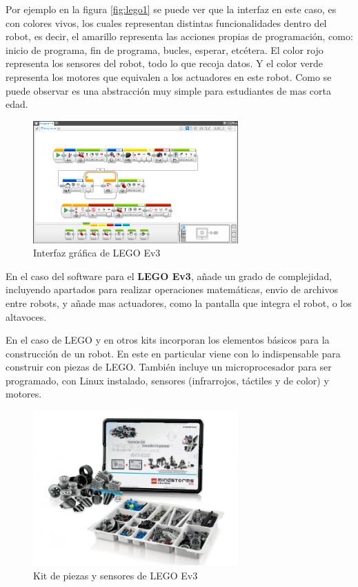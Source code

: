 \begin{itemize}
Por ejemplo en la figura \ref{fig:lego1} se puede ver que la interfaz en este caso, es con colores vivos, los cuales representan distintas funcionalidades dentro del robot, es decir, el amarillo representa las acciones propias de programación, como: inicio de programa, fin de programa, bucles, esperar, etcétera. El color rojo representa los sensores del robot, todo lo que recoja datos. Y el color verde representa los motores que equivalen a los actuadores en este robot.
Como se puede observar es una abstracción muy simple para estudiantes de mas corta edad.
	 \begin{figure}[H]
    \centering
    \includegraphics[width=0.7\textwidth]{img/lego2.jpg}
    \caption{Interfaz gráfica de LEGO Ev3} \label{fig:lego2}
    \end{figure}

En el caso del software para el \textbf{LEGO Ev3}, añade un grado de complejidad, incluyendo apartados para realizar operaciones matemáticas, envio de archivos entre robots, y añade mas actuadores, como la pantalla que integra el robot, o los altavoces.

En el caso de LEGO y en otros kits incorporan los elementos básicos para la construcción de un robot. En este en particular viene con lo indispensable para construir con piezas de LEGO. También incluye un microprocesador para ser programado, con Linux instalado, sensores (infrarrojos, táctiles y de color) y motores.
  \begin{figure}[H]
    \centering
    \includegraphics[width=0.7\textwidth]{img/kitev3.jpg}
    \caption{Kit de piezas y sensores de LEGO Ev3} \label{fig:lego3}
    \end{figure}
\end{itemize}{}


